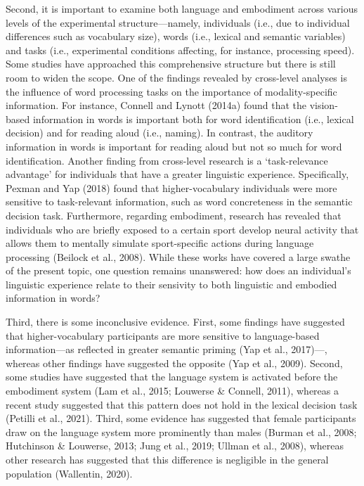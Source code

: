 \documentclass[
  12pt,
  man,floatsintext]{apa7}
\begin{document}
Second, it is important to examine both language and embodiment across various levels of the experimental structure---namely, individuals (i.e., due to individual differences such as vocabulary size), words (i.e., lexical and semantic variables) and tasks (i.e., experimental conditions affecting, for instance, processing speed). Some studies have approached this comprehensive structure but there is still room to widen the scope. One of the findings revealed by cross-level analyses is the influence of word processing tasks on the importance of modality-specific information. For instance, Connell and Lynott (2014a) found that the vision-based information in words is important both for word identification (i.e., lexical decision) and for reading aloud (i.e., naming). In contrast, the auditory information in words is important for reading aloud but not so much for word identification. Another finding from cross-level research is a `task-relevance advantage' for individuals that have a greater linguistic experience. Specifically, Pexman and Yap (2018) found that higher-vocabulary individuals were more sensitive to task-relevant information, such as word concreteness in the semantic decision task. Furthermore, regarding embodiment, research has revealed that individuals who are briefly exposed to a certain sport develop neural activity that allows them to mentally simulate sport-specific actions during language processing (Beilock et al., 2008). While these works have covered a large swathe of the present topic, one question remains unanswered: how does an individual's linguistic experience relate to their sensivity to both linguistic and embodied information in words?

Third, there is some inconclusive evidence. First, some findings have suggested that higher-vocabulary participants are more sensitive to language-based information---as reflected in greater semantic priming (Yap et al., 2017)---, whereas other findings have suggested the opposite (Yap et al., 2009). Second, some studies have suggested that the language system is activated before the embodiment system (Lam et al., 2015; Louwerse \& Connell, 2011), whereas a recent study suggested that this pattern does not hold in the lexical decision task (Petilli et al., 2021). Third, some evidence has suggested that female participants draw on the language system more prominently than males (Burman et al., 2008; Hutchinson \& Louwerse, 2013; Jung et al., 2019; Ullman et al., 2008), whereas other research has suggested that this difference is negligible in the general population (Wallentin, 2020).
\end{document}
